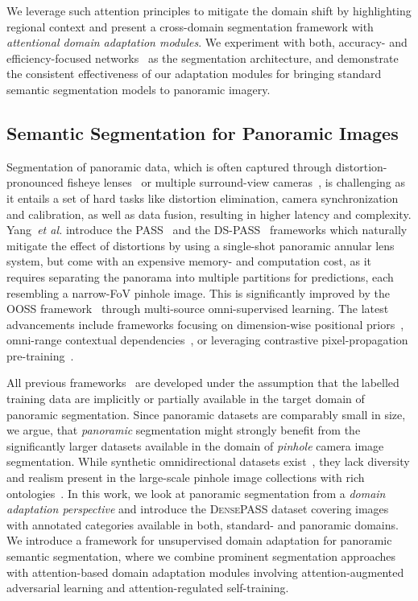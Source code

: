 \documentclass[journal]{IEEEtran}
\begin{document}
We leverage such attention principles to mitigate the domain shift by highlighting regional context and present a cross-domain segmentation framework with \emph{attentional domain adaptation modules}.
We experiment with both, accuracy- and efficiency-focused networks~\cite{danet,fanet,erfnet} as the segmentation architecture, and demonstrate the consistent effectiveness of our adaptation modules for bringing standard semantic segmentation models to panoramic imagery.

\subsection{Semantic Segmentation for  Panoramic Images}

Segmentation of panoramic data, which is often captured through distortion-pronounced fisheye lenses~\cite{fisheye,universal,adaptable_deformable} or multiple surround-view cameras~\cite{crossview,omnidet,hu2021fiery}, is challenging as it entails a set of hard tasks like distortion elimination, camera synchronization and calibration, as well as data fusion, resulting in higher latency and complexity.
Yang~\textit{et al.} introduce the PASS~\cite{pass}
and the DS-PASS~\cite{dspass} frameworks which naturally mitigate the effect of distortions by using a single-shot panoramic annular lens system, but come with an expensive memory- and computation cost, as it requires separating the panorama into multiple partitions for predictions, each resembling a narrow-FoV pinhole image.
This is significantly improved by the OOSS framework~\cite{ooss} through multi-source omni-supervised learning.
The latest advancements include frameworks focusing on dimension-wise positional priors~\cite{wildpass}, omni-range contextual dependencies~\cite{omnirange}, or leveraging contrastive pixel-propagation pre-training~\cite{pps}.

All previous frameworks~\cite{pass,omnirange,pps} are developed under the assumption that the labelled training data are implicitly or partially available in the target domain of panoramic segmentation.
Since panoramic datasets are comparably small in size, we argue, that \emph{panoramic} segmentation might strongly benefit from the significantly larger datasets available in the domain of \emph{pinhole} camera image segmentation.
While synthetic omnidirectional datasets exist~\cite{orientation,synthetic,omniscape,cortinhal2021semantics,orhan2021semantic}, they lack diversity and realism present in the large-scale pinhole image collections with rich ontologies~\cite{cityscapes,wilddash}.
In this work, we look at panoramic segmentation from a \emph{domain adaptation perspective} and introduce the \textsc{DensePASS} dataset covering images with  annotated categories available in both, standard- and panoramic domains.
We introduce a framework for unsupervised domain adaptation for panoramic semantic segmentation, where we combine prominent segmentation approaches with attention-based domain adaptation modules involving attention-augmented adversarial learning and attention-regulated self-training.
\end{document}
